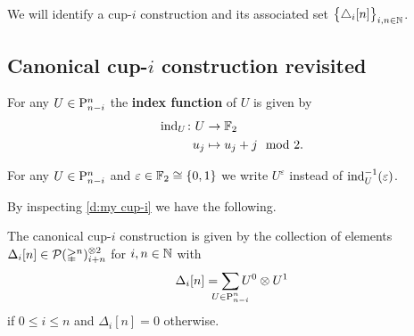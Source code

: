 We will identify a \mbox{cup-$i$} construction and its associated set $\big\{ \triangle_i [n] \big\}_{i,n \in \mathbb{N}}$.

\subsection{Canonical \mbox{cup-$i$} construction revisited}

\begin{definition}
	For any $U \in \mathrm{P}^n_{n-i}$ the \textbf{index function} of $U$ is given by
	\[
	\begin{split}
	\operatorname{ind}_U \colon U &\to {\mathbb{F}_2} \\
	u_j &\mapsto u_j + j \mod 2.
	\end{split}
	\]
\end{definition}

\begin{notation*}
	For any $U \in \mathrm{P}^n_{n-i}$ and $\varepsilon \in {\mathbb{F}_2} \cong \{0,1\}$ we write $U^\varepsilon$ instead of $\operatorname{ind}_U^{-1}(\varepsilon)$.
\end{notation*}

By inspecting \cref{d:my cup-i} we have the following.

\begin{lemma}\label{l:canonical}
	The canonical \mbox{cup-$i$} construction is given by the collection of elements $\Delta_i[n] \in \mathcal{P}(\mathbb{\Delta}^n)^{\otimes 2}_{i+n}$ for $i,n \in \mathbb{N}$ with
	\[
	\Delta_i[n] =
	\sum_{\mathclap{U \in \rP^n_{n-i}}} U^0 \ot U^1
	\]
	if $0 \leq i \leq n$ and $\Delta_i[n] = 0$ otherwise.
\end{lemma}